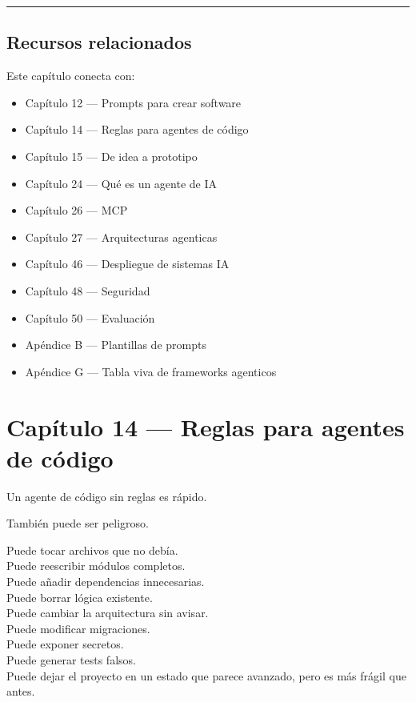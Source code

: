 \begin{center}\rule{0.5\linewidth}{0.5pt}\end{center}

\section{Recursos relacionados}\label{recursos-relacionados-12}

Este capítulo conecta con:

\begin{itemize}
\tightlist
\item
  Capítulo 12 --- Prompts para crear software
\item
  Capítulo 14 --- Reglas para agentes de código
\item
  Capítulo 15 --- De idea a prototipo
\item
  Capítulo 24 --- Qué es un agente de IA
\item
  Capítulo 26 --- MCP
\item
  Capítulo 27 --- Arquitecturas agenticas
\item
  Capítulo 46 --- Despliegue de sistemas IA
\item
  Capítulo 48 --- Seguridad
\item
  Capítulo 50 --- Evaluación
\item
  Apéndice B --- Plantillas de prompts
\item
  Apéndice G --- Tabla viva de frameworks agenticos
\end{itemize}

\newpage

\chapter{Capítulo 14 --- Reglas para agentes de
código}\label{capuxedtulo-14-reglas-para-agentes-de-cuxf3digo}

Un agente de código sin reglas es rápido.

También puede ser peligroso.

Puede tocar archivos que no debía.\\
Puede reescribir módulos completos.\\
Puede añadir dependencias innecesarias.\\
Puede borrar lógica existente.\\
Puede cambiar la arquitectura sin avisar.\\
Puede modificar migraciones.\\
Puede exponer secretos.\\
Puede generar tests falsos.\\
Puede dejar el proyecto en un estado que parece avanzado, pero es más
frágil que antes.

